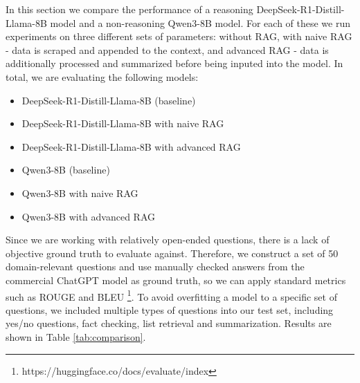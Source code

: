 \documentclass[fleqn,moreauthors,10pt]{ds_report}
\begin{document}
In this section we compare the performance of a reasoning DeepSeek-R1-Distill-Llama-8B \cite{deepseek3} model and a non-reasoning Qwen3-8B \cite{qwen3} model. For each of these we run experiments on three different sets of parameters: without RAG, with naive RAG - data is scraped and appended to the context, and advanced RAG - data is additionally processed and summarized before being inputed into the model. In total, we are evaluating the following models:
\begin{itemize}
	\item DeepSeek-R1-Distill-Llama-8B (baseline)
	\item DeepSeek-R1-Distill-Llama-8B with naive RAG
	\item DeepSeek-R1-Distill-Llama-8B with advanced RAG
	\item Qwen3-8B (baseline)
	\item Qwen3-8B with naive RAG
	\item Qwen3-8B with advanced RAG
\end{itemize}

Since we are working with relatively open-ended questions, there is a lack of objective ground truth to evaluate against. Therefore, we construct a set of 50 domain-relevant questions and use manually checked answers from the commercial ChatGPT model as ground truth, so we can apply standard metrics such as ROUGE and BLEU \footnote{https://huggingface.co/docs/evaluate/index}. To avoid overfitting a model to a specific set of questions, we included multiple types of questions into our test set, including yes/no questions, fact checking, list retrieval and summarization. Results are shown in Table \ref{tab:comparison}.

\begin{table}[!htb]
\centering
{}
\caption{Performance comparison against ChatGPT-generated ground truth.}
\label{tab:comparison}
\end{table}
\end{document}
